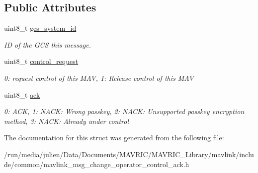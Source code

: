 \subsection*{Public Attributes}
\begin{DoxyCompactItemize}
\item 
\hypertarget{struct____mavlink__change__operator__control__ack__t_adb8f2a279063a0615952eda9f2b3dc24}{uint8\+\_\+t \hyperlink{struct____mavlink__change__operator__control__ack__t_adb8f2a279063a0615952eda9f2b3dc24}{gcs\+\_\+system\+\_\+id}}\label{struct____mavlink__change__operator__control__ack__t_adb8f2a279063a0615952eda9f2b3dc24}

\begin{DoxyCompactList}\small\item\em I\+D of the G\+C\+S this message. \end{DoxyCompactList}\item 
\hypertarget{struct____mavlink__change__operator__control__ack__t_a3b0abe5ae412967c3341c6e90f09d0d6}{uint8\+\_\+t \hyperlink{struct____mavlink__change__operator__control__ack__t_a3b0abe5ae412967c3341c6e90f09d0d6}{control\+\_\+request}}\label{struct____mavlink__change__operator__control__ack__t_a3b0abe5ae412967c3341c6e90f09d0d6}

\begin{DoxyCompactList}\small\item\em 0\+: request control of this M\+A\+V, 1\+: Release control of this M\+A\+V \end{DoxyCompactList}\item 
\hypertarget{struct____mavlink__change__operator__control__ack__t_a420017052e533270a67f82a663bc07fa}{uint8\+\_\+t \hyperlink{struct____mavlink__change__operator__control__ack__t_a420017052e533270a67f82a663bc07fa}{ack}}\label{struct____mavlink__change__operator__control__ack__t_a420017052e533270a67f82a663bc07fa}

\begin{DoxyCompactList}\small\item\em 0\+: A\+C\+K, 1\+: N\+A\+C\+K\+: Wrong passkey, 2\+: N\+A\+C\+K\+: Unsupported passkey encryption method, 3\+: N\+A\+C\+K\+: Already under control \end{DoxyCompactList}\end{DoxyCompactItemize}


The documentation for this struct was generated from the following file\+:\begin{DoxyCompactItemize}
\item 
/run/media/julien/\+Data/\+Documents/\+M\+A\+V\+R\+I\+C/\+M\+A\+V\+R\+I\+C\+\_\+\+Library/mavlink/include/common/mavlink\+\_\+msg\+\_\+change\+\_\+operator\+\_\+control\+\_\+ack.\+h\end{DoxyCompactItemize}
